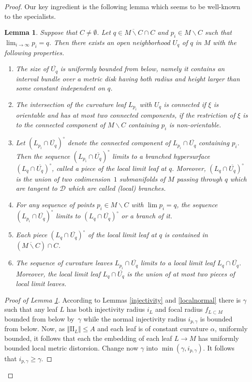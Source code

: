 \documentclass[JEP,XML,SOM,Unicode]{cedram}
\let\mathcal\mathscr
\let\moins\smallsetminus
\newcommand{\II}{\mathrm{II}}
\let\parallel\Vert
\newtheorem{lemma}[theorem]{Lemma}
\theoremstyle{definition}
\theoremstyle{remark}
\numberwithin{equation}{section}
\begin{document}
\begin{proof}
Our key ingredient is the following lemma which seems to be well-known to the specialists.
\begin{lemma}\label{convergence}
Suppose that $C\neq \emptyset$.
Let $q\in \overline{M\moins C}\cap C$ and $p_i\in M\moins C$ such that $\lim_{i\to \infty}p_i=q$. Then there exists an open
neighborhood $U_q$ of $q$ in $M$ with the following properties.
\begin{enumerate}
\item The size of $ \overline{U_q}$ is uniformly bounded from below, namely it contains an interval bundle over a metric disk having both radius and
height larger than some constant independent on $q$.
\item\label{convergence2} The intersection of the curvature leaf $L_{p_i}$ with $U_q$ is connected if $\xi$ is orientable and has at most
two connected components, if the restriction of $\xi$ is to the connected component of $M\moins C$ containing $p_i$ is non-orientable.
\item Let $(L_{p_i}\cap \overline{U_q})^{\circ}$ denote the connected component of $L_{p_i}\cap \overline{U_q}$ containing $p_i$.
Then the sequence $(L_{p_i}\cap \overline{U_q})^{\circ}$ limits to a branched hypersurface
$(L_q\cap \overline{U_q})^{\circ}$, called a piece of the local limit leaf at $q$. Moreover, $(L_q\cap \overline{U_q})^{\circ}$ is the union of two
codimension~$1$ submanifolds of $M$ passing through $q$ which are tangent to $\mathcal D$ which are called (local) branches.
\item\label{convergence4} For any sequence of points $p_i\in M\moins C$ with $\lim p_i=q$,
the sequence $(L_{p_i}\cap \overline{U_q})^{\circ}$ limits to $(L_q\cap \overline{U_q})^{\circ}$ or a branch of it.
\item Each piece $(L_q\cap \overline{U_q})^{\circ}$ of the local limit leaf at $q$ is contained in $(\overline{M\moins C})\cap C$.
\item The sequence of curvature leaves $L_{p_i}\cap \overline{U_q}$ limits to a local limit leaf $L_q\cap \overline{U_q}$.
Moreover, the local limit leaf $L_q\cap \overline{U_q}$ is the union of at most
two pieces of local limit leaves.
\end{enumerate}
\end{lemma}
\begin{proof}[Proof of Lemma \ref{convergence}]
According to Lemmas \ref{injectivity} and \ref{localnormal} there is $\gamma$ such that any leaf $L$
has both injectivity radius $i_L$ and focal radius $f_{L\subset M}$ bounded from below by~$\gamma$ while the normal injectivity radius
$i_{p, \gamma}$ is bounded from below. Now, as $\parallel \II_{L} \parallel \leq A$ and each leaf is of constant curvature $\alpha$, uniformly bounded, it follows that each the embedding of each leaf $L\to M$ has uniformly bounded local metric distorsion.
Change now $\gamma$ into $\min(\gamma, i_{p,\gamma})$.
It follows that $i_{p,\gamma}\geq\gamma$.


\end{proof}
\end{proof}
\end{document}
